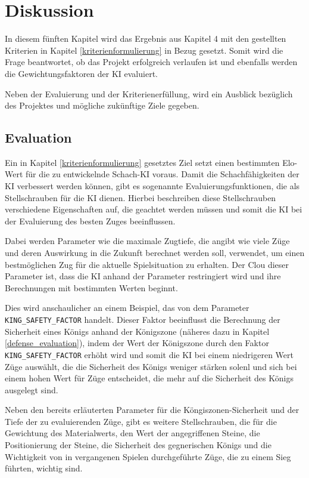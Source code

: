 \chapter{Diskussion}

In diesem fünften Kapitel wird das Ergebnis aus Kapitel 4 mit den gestellten Kriterien in Kapitel \ref{kriterienformulierung} in Bezug gesetzt. Somit wird die Frage beantwortet, ob das Projekt erfolgreich verlaufen ist und ebenfalls werden die Gewichtungsfaktoren der KI evaluiert. 

Neben der Evaluierung und der Kriterienerfüllung, wird ein Ausblick bezüglich des Projektes und mögliche zukünftige Ziele gegeben.

\section{Evaluation}\label{evaluation}
Ein in Kapitel \ref{kriterienformulierung} gesetztes Ziel setzt einen bestimmten Elo-Wert für die zu entwickelnde Schach-KI voraus. Damit die Schachfähigkeiten der KI verbessert werden können, gibt es sogenannte Evaluierungsfunktionen, die als Stellschrauben für die KI dienen. Hierbei beschreiben diese Stellschrauben verschiedene Eigenschaften auf, die geachtet werden müssen und somit die KI bei der Evaluierung des besten Zuges beeinflussen. 

Dabei werden Parameter wie die maximale Zugtiefe, die angibt wie viele Züge und deren Auswirkung in die Zukunft berechnet werden soll, verwendet, um einen bestmöglichen Zug für die aktuelle Spielsituation zu erhalten. Der Clou dieser Parameter ist, dass die KI anhand der Parameter restringiert wird und ihre Berechnungen mit bestimmten Werten beginnt.

Dies wird anschaulicher an einem Beispiel, das von dem Parameter \texttt{KING\_SAFETY\_FACTOR} handelt. Dieser Faktor beeinflusst die Berechnung der Sicherheit eines Königs anhand der Königszone (näheres dazu in Kapitel \ref{defense_evaluation}), indem der Wert der Königszone durch den Faktor \texttt{KING\_SAFETY\_FACTOR} erhöht wird und somit die KI bei einem niedrigeren Wert Züge auswählt, die die Sicherheit des Königs weniger stärken solenl und sich bei einem hohen Wert für Züge entscheidet, die mehr auf die Sicherheit des Königs ausgelegt sind.

Neben den bereits erläuterten Parameter für die Köngiszonen-Sicherheit und der Tiefe der zu evaluierenden Züge, gibt es weitere Stellschrauben, die für die Gewichtung des Materialwerts, den Wert der angegriffenen Steine, die Positionierung der Steine, die Sicherheit des gegnerischen Königs und die Wichtigkeit von in vergangenen Spielen durchgeführte Züge, die zu einem Sieg führten, wichtig sind.

